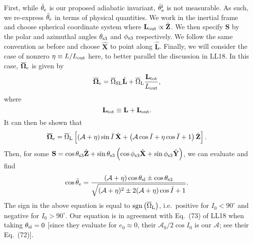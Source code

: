 \documentclass[
        twocolumn,
        twocolappendix
    ]{aastex63}
\renewcommand*{\bm}[1]{\boldsymbol{\mathbf{#1}}}
\newcommand*{\uv}[1]{\hat{\bm{#1}}}
\newcommand*{\p}[1]{\left(#1\right)}
\newcommand*{\s}[1]{\left[#1\right]}
\begin{document}
First, while $\bar{\theta}_{\rm e}$ is our proposed adiabatic invariant,
$\bar{\theta}_{\rm e}^{\rm i}$ is not measurable. As such, we re-express
$\bar{\theta}_{\rm e}$ in terms of physical quantities. We work in the
inertial frame and choose spherical coordinate system where $\bm{L}_{\rm out}
\propto \uv{Z}$. We then specify $\bm{S}$ by the polar and azimuthal angles
$\theta_{\rm s3}$ and $\phi_{ \rm s3}$ respectively. We follow the same
convention as before and choose $\uv{X}$ to point along $\uv{L}$. Finally, we
will consider the case of nonzero $\eta \equiv L / L_{\rm out}$ here, to better
parallel the discussion in LL18. In this case, $\bm{\overline{\Omega}}_{\rm e}$
is given by \citep{bin1}
\begin{equation}
    \bm{\overline{\Omega}}_{\rm e} = \overline{\Omega}_{\rm SL} \uv{L}
        + \overline{\Omega}_{\rm L}\frac{\bm{L}_{\rm tot}}{L_{\rm out}},
\end{equation}
where
\begin{equation}
    \bm{L}_{\rm tot} \equiv \bm{L} + \bm{L}_{\rm out}.
\end{equation}
It can then be shown that
\begin{equation}
    \bm{\overline{\Omega}}_{\rm e} = \overline{\Omega}_{\rm L}\s{\p{
        \mathcal{A} + \eta}\sin \bar{I}\,\uv{X} + \p{\mathcal{A}\cos \bar{I} +
        \eta\cos \bar{I} + 1} \uv{Z}}.
\end{equation}
Then, for some $\bm{S} = \cos \theta_{\rm s3} \uv{Z} + \sin \theta_{\rm
s3}\p{\cos \phi_{\rm s3}\uv{X} + \sin \phi_{\rm s3}\uv{Y}}$, we can evaluate and
find
\begin{equation}
    \cos \bar{\theta}_{\rm e} =
        \frac{\p{\mathcal{A} + \eta}\cos \theta_{\rm sl} \pm \cos \theta_{\rm
        s3}}{\sqrt{(\mathcal{A} + \eta)^2 \pm 2(\mathcal{A} + \eta)\cos \bar{I}
            + 1}}.\label{eq:cos_qe_explicit}
\end{equation}
The sign in the above equation is equal to
$\mathrm{sgn}\p{\overline{\Omega}_{\rm L}}$, i.e.\ positive for $I_0 < 90^\circ$
and negative for $I_0 > 90^\circ$. Our equation is in agreement with Eq.~(73) of
LL18 when taking $\theta_{\rm sl} = 0$ [since they evaluate for $e_0 \approx 0$,
their $\mathcal{A}_0 / 2 \cos I_0$ is our $\mathcal{A}$; see their Eq.~(72)].
\end{document}
